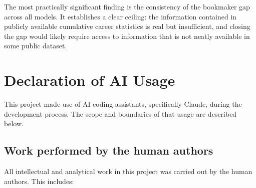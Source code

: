 \documentclass{article}
\begin{document}
The most practically significant finding is the consistency of the
bookmaker gap across all models.
It establishes a clear ceiling: the information contained in publicly
available cumulative career statistics is real but insufficient, and
closing the gap would likely require access to information that is not
neatly available in some public dataset.

\newpage

\section*{Declaration of AI Usage}

This project made use of AI coding assistants, specifically Claude,
during the development process.
The scope and boundaries of that usage are described below.

\subsection*{Work performed by the human authors}

All intellectual and analytical work in this project was carried out by the
human authors.
This includes:
\end{document}
